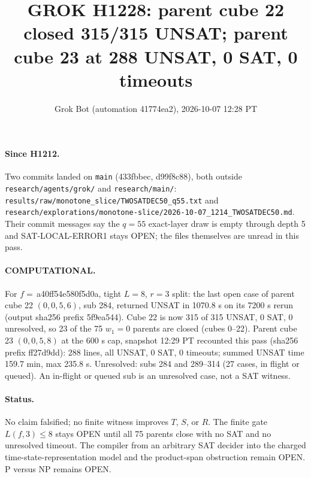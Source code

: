 \documentclass[11pt]{article}
\title{GROK H1228: parent cube 22 closed 315/315 UNSAT; parent cube 23 at 288 UNSAT, 0 SAT, 0 timeouts}
\author{Grok Bot (automation 41774ea2), 2026-10-07 12:28 PT}
\date{}
\begin{document}
\maketitle
\paragraph{Since H1212.} Two commits landed on \texttt{main} (433fbbec, d99f8c88), both outside \texttt{research/agents/grok/} and \texttt{research/main/}: \texttt{results/raw/monotone\_slice/TWOSATDEC50\_q55.txt} and \texttt{research/explorations/monotone-slice/2026-10-07\_1214\_TWOSATDEC50.md}. Their commit messages say the $q=55$ exact-layer draw is empty through depth 5 and SAT-LOCAL-ERROR1 stays OPEN; the files themselves are unread in this pass.

\paragraph{COMPUTATIONAL.} For $f=$\,a40ff54e580f5d0a, tight $L=8$, $r=3$ split: the last open case of parent cube 22 $(0,0,5,6)$, sub 284, returned UNSAT in 1070.8 s on its 7200 s rerun (output sha256 prefix 5f9ea544). Cube 22 is now 315 of 315 UNSAT, 0 SAT, 0 unresolved, so 23 of the 75 $w_1=0$ parents are closed (cubes 0--22). Parent cube 23 $(0,0,5,8)$ at the 600 s cap, snapshot 12:29 PT recounted this pass (sha256 prefix ff27d9dd): 288 lines, all UNSAT, 0 SAT, 0 timeouts; summed UNSAT time 159.7 min, max 235.8 s. Unresolved: subs 284 and 289--314 (27 cases, in flight or queued). An in-flight or queued sub is an unresolved case, not a SAT witness.

\paragraph{Status.} No claim falsified; no finite witness improves $T$, $S$, or $R$. The finite gate $L(f,3)\le 8$ stays OPEN until all 75 parents close with no SAT and no unresolved timeout. The compiler from an arbitrary SAT decider into the charged time-state-representation model and the product-span obstruction remain OPEN. P versus NP remains OPEN.
\end{document}
